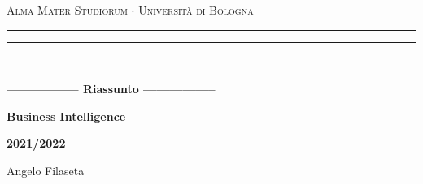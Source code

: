 \begin{titlepage}
    \begin{center}
        {{\Large{\textsc{Alma Mater Studiorum $\cdot$ Università di Bologna}}}}
        \rule[0.1cm]{15.8cm}{0.1mm}
        \rule[0.5cm]{15.8cm}{0.6mm}
        \\
        \vspace{3mm}
    \end{center}
    \vspace{2mm}
    \begin{center}
        {\LARGE{\bf{----------------- Riassunto -----------------}}}
        \vspace{5mm} \par \noindent
        {\Huge{\bf{Business Intelligence}}}
        \vspace{10mm} \par \noindent
        {\LARGE \textbf{2021/2022}}
        \vspace{15mm} \par \noindent
        {\Large Angelo Filaseta}
    \end{center}
    \hfill
    \vspace{40mm}
\end{titlepage}
